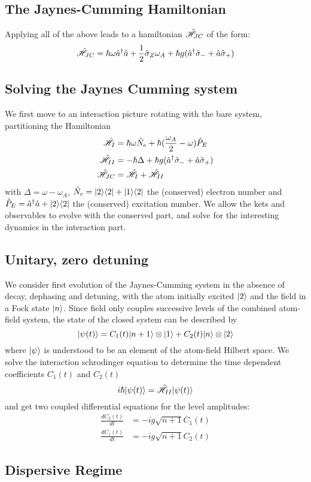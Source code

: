\subsection{The Jaynes-Cumming Hamiltonian}
Applying all of the above leads to a hamiltonian $\hat{\mathscr{H}}_{JC}$ of the form:
\begin{equation}
	\hat{\mathscr{H}}_{JC} = \hbar \omega \hat{a}^\dagger \hat{a} +\frac{1}{2} \hat{\sigma}_Z \omega_A + \hbar g (\hat{a}^\dagger \hat{\sigma}_- + \hat{a} \hat{\sigma}_+)
	\label{HJC}
\end{equation}
\subsection{Solving the Jaynes Cumming system}
We first move to an interaction picture rotating with the bare system, partitioning the Hamiltonian
\begin{align}
	\hat{\mathscr{H}}_I &= \hbar \omega \hat{N}_e + \hbar(\frac{\omega_A}{2}-\omega)\hat{P}_E \\
	\hat{\mathscr{H}}_{II} &= -\hbar \Delta + \hbar g (\hat{a}^\dagger \hat{\sigma}_- + \hat{a} \hat{\sigma}_+) \\
	\hat{\mathscr{H}}_{JC} &= \hat{\mathscr{H}}_I+\hat{\mathscr{H}}_{II}
\end{align}
with $\Delta = \omega-\omega_A$,   $\hat{N}_e = | 2 \rangle \langle 2 | + | 1 \rangle \langle 2 | $ the (conserved) electron number and $\hat{P}_E = \hat{a}^\dagger\hat{a} + | 2 \rangle\langle 2 | $ the (conserved) excitation number. We allow the kets and observables to evolve with the conserved part, and solve for the interesting dynamics in the interaction part. 
\subsection{Unitary, zero detuning}
We consider first evolution of the Jaynes-Cumming system in the absence of decay, dephasing and detuning, with the atom initially excited $| 2 \rangle$ and the field in a Fock state $| n \rangle$. Since field only couples successive levels of the combined atom-field system, the state of the closed system can be described by
\begin{equation}
	| \psi(t) \rangle = C_1(t) | n+1 \rangle \otimes | 1 \rangle + C_2(t) | n \rangle \otimes | 2 \rangle
\end{equation}
where $| \psi \rangle$ is understood to be an element of the atom-field Hilbert space. We solve the interaction schrodinger equation to determine the time dependent coefficients $C_1(t)$ and $C_2(t)$
\begin{equation}
	i \hbar | \psi(t) \rangle = \hat{\mathscr{H}}_{II} | \psi(t) \rangle
\end{equation}
and get two coupled differential equations for the level amplitudes:
\begin{align}
	\frac{d C_2(t)}{dt} &= -i g \sqrt{n+1}C_1(t)\\
	\frac{d C_1(t)}{dt} &= -i g \sqrt{n+1}C_2(t)
\end{align}


\subsection{Dispersive Regime}

